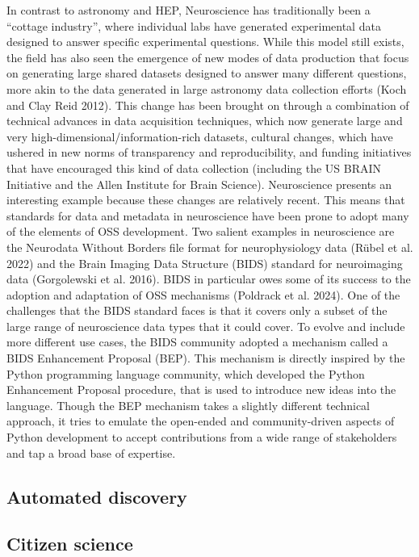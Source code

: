 \documentclass[
  letterpaper,
  DIV=11,
  numbers=noendperiod]{scrartcl}
\begin{document}
In contrast to astronomy and HEP, Neuroscience has traditionally been a
``cottage industry'', where individual labs have generated experimental
data designed to answer specific experimental questions. While this
model still exists, the field has also seen the emergence of new modes
of data production that focus on generating large shared datasets
designed to answer many different questions, more akin to the data
generated in large astronomy data collection efforts (Koch and Clay Reid
2012). This change has been brought on through a combination of
technical advances in data acquisition techniques, which now generate
large and very high-dimensional/information-rich datasets, cultural
changes, which have ushered in new norms of transparency and
reproducibility, and funding initiatives that have encouraged this kind
of data collection (including the US BRAIN Initiative and the Allen
Institute for Brain Science). Neuroscience presents an interesting
example because these changes are relatively recent. This means that
standards for data and metadata in neuroscience have been prone to adopt
many of the elements of OSS development. Two salient examples in
neuroscience are the Neurodata Without Borders file format for
neurophysiology data (Rübel et al. 2022) and the Brain Imaging Data
Structure (BIDS) standard for neuroimaging data (Gorgolewski et al.
2016). BIDS in particular owes some of its success to the adoption and
adaptation of OSS mechanisms (Poldrack et al. 2024). One of the
challenges that the BIDS standard faces is that it covers only a subset
of the large range of neuroscience data types that it could cover. To
evolve and include more different use cases, the BIDS community adopted
a mechanism called a BIDS Enhancement Proposal (BEP). This mechanism is
directly inspired by the Python programming language community, which
developed the Python Enhancement Proposal procedure, that is used to
introduce new ideas into the language. Though the BEP mechanism takes a
slightly different technical approach, it tries to emulate the
open-ended and community-driven aspects of Python development to accept
contributions from a wide range of stakeholders and tap a broad base of
expertise.

\subsection{Automated discovery}\label{automated-discovery}

\subsection{Citizen science}\label{citizen-science}
\end{document}
